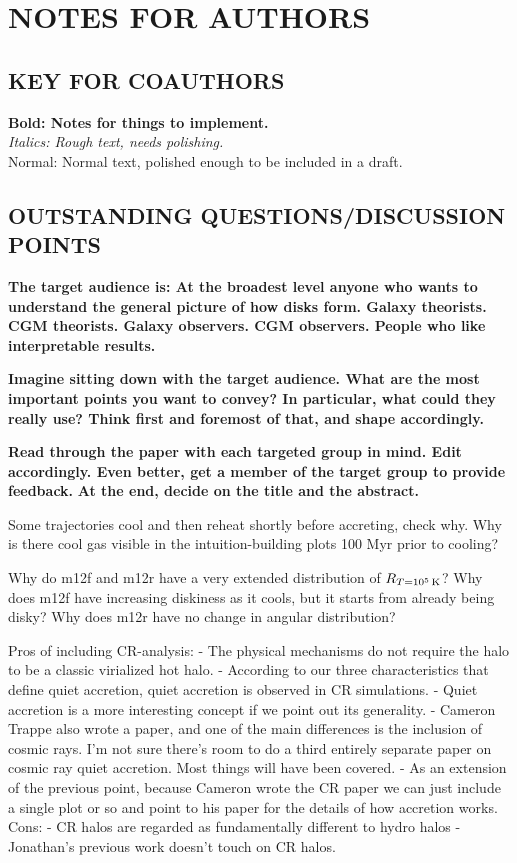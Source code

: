 \documentclass[fleqn,usenatbib]{mnras}
\newcommand{\Rcon}{R_{T=10^5\,{\rm K}}}
\begin{document}
\section{NOTES FOR AUTHORS}

\subsection{KEY FOR COAUTHORS}
\textbf{Bold: Notes for things to implement.} \\
\textit{Italics: Rough text, needs polishing.} \\
Normal: Normal text, polished enough to be included in a draft.

\subsection{OUTSTANDING QUESTIONS/DISCUSSION POINTS}

\textbf{
The target audience is:
At the broadest level anyone who wants to understand the general picture of how disks form.
Galaxy theorists.
CGM theorists.
Galaxy observers.
CGM observers.
People who like interpretable results.
}

\textbf{
Imagine sitting down with the target audience.
What are the most important points you want to convey?
In particular, what could they really use?
Think first and foremost of that, and shape accordingly.
}

\textbf{
Read through the paper with each targeted group in mind.
Edit accordingly.
Even better, get a member of the target group to provide feedback.
}
\textbf{
At the end, decide on the title and the abstract.
}

Some trajectories cool and then reheat shortly before accreting, check why.
Why is there cool gas visible in the intuition-building plots 100 Myr prior to cooling?

Why do m12f and m12r have a very extended distribution of $\Rcon$?
Why does m12f have increasing diskiness as it cools, but it starts from already being disky?
Why does m12r have no change in angular distribution?

Pros of including CR-analysis:
- The physical mechanisms do not require the halo to be a classic virialized hot halo.
- According to our three characteristics that define quiet accretion, quiet accretion is observed in CR simulations.
- Quiet accretion is a more interesting concept if we point out its generality.
- Cameron Trappe also wrote a paper, and one of the main differences is the inclusion of cosmic rays. I'm not sure there's room to do a third entirely separate paper on cosmic ray quiet accretion. Most things will have been covered.
- As an extension of the previous point, because Cameron wrote the CR paper we can just include a single plot or so and point to his paper for the details of how accretion works.
Cons:
- CR halos are regarded as fundamentally different to hydro halos
- Jonathan's previous work doesn't touch on CR halos.
\end{document}
